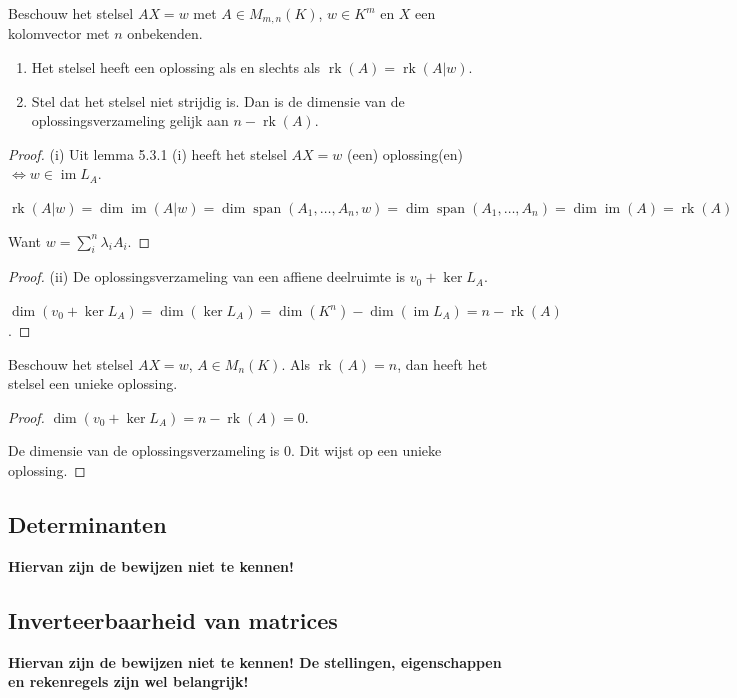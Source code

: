 \begin{stelling}[5.3.2]
    Beschouw het stelsel $AX = w$ met $A \in M_{m,n}(K)$, $w \in K^m$ en $X$ een kolomvector met $n$ onbekenden.
    \begin{enumerate}
        \item[(i)] Het stelsel heeft een oplossing als en slechts als $\operatorname{rk}(A) = \operatorname{rk}(A|w)$.
        \item[(ii)] Stel dat het stelsel niet strijdig is. Dan is de dimensie van de oplossingsverzameling gelijk aan $n - \operatorname{rk}(A)$.
    \end{enumerate}
\end{stelling}
\begin{proof}(i)
    Uit lemma 5.3.1 (i) heeft het stelsel \(AX = w\) (een) oplossing(en) \(\iff w \in \operatorname{im}L_A\).
    
    \(\operatorname{rk}(A|w) 
    = \dim \operatorname{im}(A|w)
    = \dim \operatorname{span}(A_1,\dots,A_n,w)
    = \dim \operatorname{span}(A_1,\dots,A_n)
    = \dim \operatorname{im}(A)
    = \operatorname{rk}(A)
     \)

     Want \(w = \sum_{i}^{n}\lambda_i A_i\).
\end{proof}
\begin{proof}(ii)
    De oplossingsverzameling van een affiene deelruimte is \(v_0 + \ker L_A\).

    \(\dim(v_0 + \ker L_A) = \dim (\ker L_A) = \dim (K^n) - \dim(\operatorname{im}L_A) = n - \operatorname{rk}(A)\).
\end{proof}

\begin{gevolg}[5.3.3]
    Beschouw het stelsel $AX = w$, $A \in M_n(K)$. Als $\operatorname{rk}(A) = n$, dan heeft het stelsel een unieke oplossing.
\end{gevolg}
\begin{proof}
    \(\dim(v_0 + \ker L_A) = n - \operatorname{rk}(A) = 0\).

    De dimensie van de oplossingsverzameling is \(0\). Dit wijst op een unieke oplossing.
\end{proof}

\subsection{ Determinanten}
\textbf{Hiervan zijn de bewijzen niet te kennen!}
\subsection{Inverteerbaarheid van matrices}
\textbf{Hiervan zijn de bewijzen niet te kennen! De stellingen, eigenschappen en rekenregels zijn wel belangrijk!}